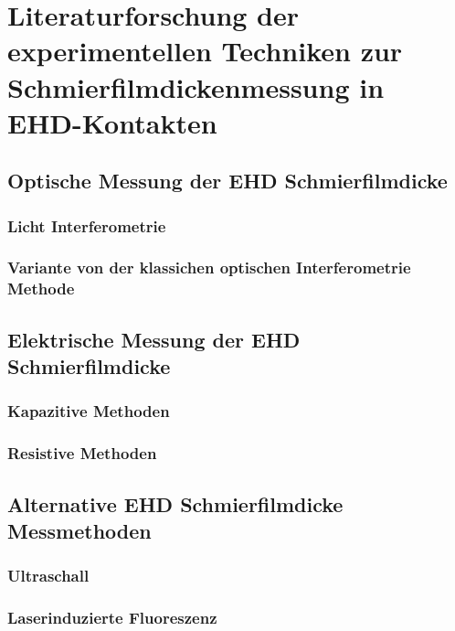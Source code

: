 \chapter{Literaturforschung der experimentellen Techniken zur Schmierfilmdickenmessung in EHD-Kontakten}
\label{chap:literaturforschung_der_experimentellen_technik_in_ehd_schmierung}
\section{Optische Messung der EHD Schmierfilmdicke}
\label{sec:optische_messung_der_ehd_schmierfilmdicke}

\subsection{Licht Interferometrie}
\label{ssec:licht_interferometrie}

\subsection{Variante von der klassichen optischen Interferometrie Methode}
\label{ssec:variante_interferometrie}

\section{Elektrische Messung der EHD Schmierfilmdicke}
\label{sec:elektrische_messung_der_ehd_schmierfilmdicke}

\subsection{Kapazitive Methoden}
\label{ssec:kapazitive_methoden}

\subsection{Resistive Methoden}
\label{ssec:resistive_methoden}

\section{Alternative EHD Schmierfilmdicke Messmethoden}
\label{sec:alternative_messmethoden}

\subsection{Ultraschall}
\label{ssec:ultraschall}

\subsection{Laserinduzierte Fluoreszenz}
\label{ssec:laserinduzierte_fluoreszenz}
